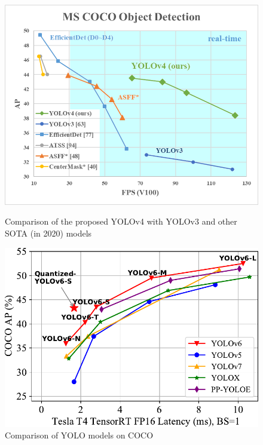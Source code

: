 \documentclass[12pt, a4paper]{article}
\begin{document}
\begin{figure}[h]
    \centering
    \begin{minipage}{0.45\textwidth}
        \centering
        \includegraphics[width=\linewidth]{pictures/yolov4.png}
        \caption{Comparison of the proposed YOLOv4 with YOLOv3 and other SOTA (in 2020) models}
        \label{fig:yolov4}
    \end{minipage}
    \hfill
    \begin{minipage}{0.45\textwidth}
        \centering
        \includegraphics[width=\linewidth]{pictures/yolov6.pdf}
        \caption{Comparison of YOLO models on COCO}
        \label{fig:yolov6}
    \end{minipage}
\end{figure}
\end{document}
